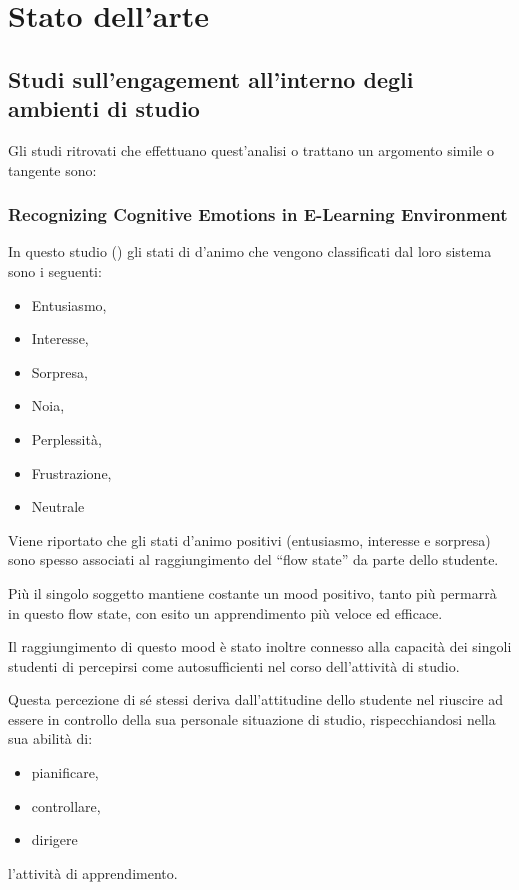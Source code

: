 \chapter{Stato dell'arte}

\section{Studi sull’engagement all’interno degli ambienti di studio}
Gli studi ritrovati che effettuano quest’analisi o trattano un argomento simile o tangente sono:
\subsection{Recognizing Cognitive Emotions in E-Learning Environment}
In questo studio (\cite{RecoCognEmoELearnEnv}) gli stati di d’animo che vengono classificati dal loro sistema sono i seguenti:
\begin{itemize}
    \item Entusiasmo,
    \item Interesse,
    \item Sorpresa,
    \item Noia,
    \item Perplessità,
    \item Frustrazione,
    \item Neutrale
\end{itemize}

Viene riportato che gli stati d’animo positivi (entusiasmo, interesse e sorpresa) sono spesso associati al raggiungimento del “flow state” da parte dello studente.

Più il singolo soggetto mantiene costante un mood positivo, tanto più permarrà in questo flow state, con esito un apprendimento più veloce ed efficace.

Il raggiungimento di questo mood è stato inoltre connesso alla capacità dei singoli studenti di percepirsi come autosufficienti nel corso dell’attività di studio.

Questa percezione di sé stessi deriva dall’attitudine dello studente nel riuscire ad essere in controllo della sua personale situazione di studio, rispecchiandosi nella sua abilità di:
\begin{itemize}
    \item pianificare,
    \item controllare,
    \item dirigere
\end{itemize}
l’attività di apprendimento.

